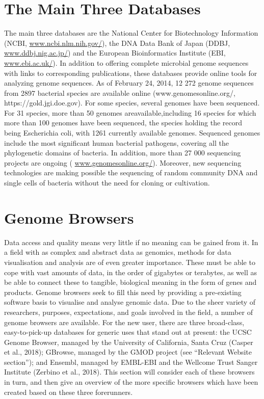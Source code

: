 \section{The Main Three Databases}
The main three databases are the National Center for Biotechnology Information (NCBI, \url{www.ncbi.nlm.nih.gov/}), the DNA Data Bank of Japan (DDBJ, \url{www.ddbj.nig.ac.jp/}) and the European Bioinformatics Institute (EBI, \url{www.ebi.ac.uk/}). In addition to offering complete microbial genome sequences with links to corresponding publications, these databases provide online tools for analyzing genome sequences. As of February 24, 2014, 12 272 genome sequences from 2897 bacterial species are available online (www.genomesonline.org/, https://gold.jgi.doe.gov). For some species, several genomes have  been sequenced. For 31 species, more than 50 genomes areavailable,including 16 species for which more than 100 genomes have been sequenced, the species holding the record being Escherichia coli, with 1261 currently available genomes. Sequenced genomes include the most significant human bacterial pathogens, covering all the phylogenetic domains of bacteria. In addition, more than 27 000 sequencing projects are ongoing (  \url{www.genomesonline.org/})\cite{ray2003}. Moreover, new sequencing technologies are making possible the sequencing of random community DNA and single cells of bacteria without the need for cloning or cultivation. 

\section{Genome Browsers} 
Data access and quality means very little if no meaning can be gained from it. In a field with as complex and abstract data as
genomics, methods for data visualisation and analysis are of even greater importance. These must be able to cope with vast
amounts of data, in the order of gigabytes or terabytes, as well as be able to connect these to tangible, biological meaning in the form of genes and products. Genome browsers seek to fill this need by providing a pre-existing software basis to visualise and analyse genomic data. Due to the sheer variety of researchers, purposes, expectations, and goals involved in the field, a number of genome browsers are available. For the new user, there are three broad-class, easy-to-pick-up databases for generic uses that stand out at present: the UCSC Genome Browser, managed by the University of California, Santa Cruz (Casper et al., 2018); GBrowse, managed by the GMOD project (see “Relevant Website section”); and Ensembl, managed by EMBL-EBI and the Wellcome Trust Sanger Institute (Zerbino et al., 2018). This section will consider each of these browsers in turn, and then give an overview of the
more specific browsers which have been created based on these three forerunners\cite{ranganathan2018encyclopedia}.

